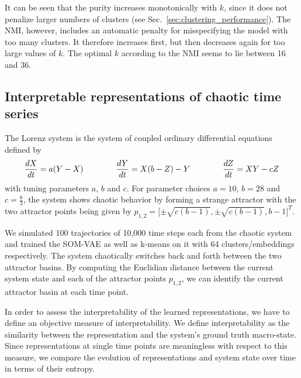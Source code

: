 It can be seen that the purity increases monotonically with $k$, since it does not penalize larger numbers of clusters (see Sec.~\ref{sec:clustering_performance}).
The NMI, however, includes an automatic penalty for misspecifying the model with too many clusters.
It therefore increases first, but then decreases again for too large values of $k$.
The optimal $k$ according to the NMI seems to lie between 16 and 36.


\subsection{Interpretable representations of chaotic time series}\label{sec:lorenz_appendix}

The Lorenz system is the system of coupled ordinary differential equations defined by
%
\begin{equation*}
	\frac{dX}{dt} = a (Y - X) \hskip 4em
	\frac{dY}{dt} = X (b - Z) - Y \hskip 4em
	\frac{dZ}{dt} = XY - cZ
\end{equation*}
%
with tuning parameters $a$, $b$ and $c$. For parameter choices $a = 10$, $b = 28$ and $c = \frac{8}{3}$, the system shows chaotic behavior by forming a strange attractor \citep{Tucker1999} with the two attractor points being given by $p_{1,2} = \lbrack \pm \sqrt{c (b-1)}, \pm \sqrt{c (b-1)}, b-1 \rbrack^T$.

We simulated 100 trajectories of 10,000 time steps each from the chaotic system and trained the SOM-VAE as well as k-means on it with 64 clusters/embeddings respectively.
The system chaotically switches back and forth between the two attractor basins.
By computing the Euclidian distance between the current system state and each of the attractor points $p_{1,2}$, we can identify the current attractor basin at each time point.

In order to assess the interpretability of the learned representations, we have to define an objective measure of interpretability.
We define interpretability as the similarity between the representation and the system's ground truth macro-state.
Since representations at single time points are meaningless with respect to this measure, we compare the evolution of representations and system state over time in terms of their entropy.

